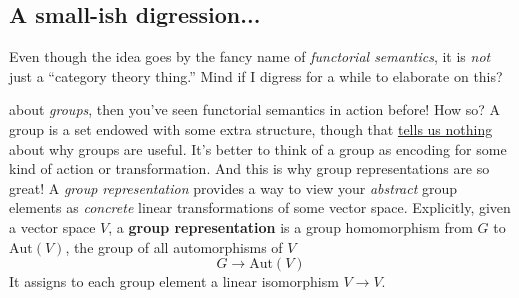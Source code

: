 \documentclass{tufte-handout-tai}
\theoremstyle{plain}
\theoremstyle{definition}
\theoremstyle{remark}
\begin{document}
\newpage







\subsection*{A small-ish digression...}
Even though the idea goes by the fancy name of \textit{functorial semantics}, it is \textit{not} just a ``category theory thing.'' Mind if I digress for a while to elaborate on this? 

 about \textit{groups}, then you've seen functorial semantics in action before! How so? A group is a set endowed with some extra structure, though that \href{https://twitter.com/evelynjlamb/status/968618077003825152}{tells us nothing} about why groups are useful. It's better to think of a group as encoding for some kind of action or transformation.
And this is why group representations are so great! A \textit{group representation} provides a way to view your \textit{abstract} group elements as \textit{concrete} linear transformations of some vector space. Explicitly, given a vector space $V$, a \textbf{group representation} is a group homomorphism from $G$ to $\text{Aut}(V)$, the group of all automorphisms of $V$
\[G\to \text{Aut}(V)\]
It assigns to each group element a linear isomorphism $V\to V.$
\end{document}
